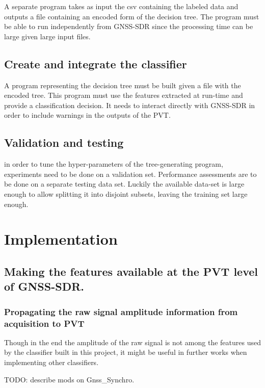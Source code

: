 \documentclass[a4paper]{usiinfbachelorproject}
\begin{document}
A separate program takes as input the csv containing the labeled data and outputs a file containing an encoded form of the decision tree. The program must be able to run independently from GNSS-SDR since the processing time can be large given
large input files.

	\subsection{\textbf{Create and integrate the classifier}}
	
A program representing the decision tree must be built given a file with the encoded tree. This program must use the features extracted at run-time and provide a classification decision. It needs to interact directly with GNSS-SDR in order
to include warnings in the outputs of the PVT.
	
	\subsection{\textbf{Validation and testing}}
	
in order to tune the hyper-parameters of the tree-generating program, experiments need to be done on a validation set.
Performance assessments are to be done on a separate testing data set. Luckily the available data-set is large enough
to allow splitting it into disjoint subsets, leaving the training set large enough.
		
		
\section{\textbf{Implementation}}

\subsection{Making the features available at the PVT level of GNSS-SDR.}

\subsubsection{Propagating the raw signal amplitude information from acquisition to PVT}

Though in the end the amplitude of the raw signal is not among the features used by the classifier 
built in this project, it might be useful in further works when implementing other classifiers.

TODO: describe mods on Gnss\_Synchro.
\end{document}
